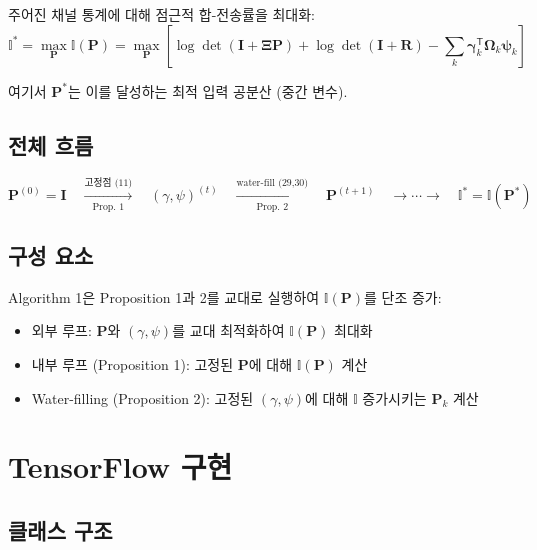 \documentclass[10pt]{article}
\begin{document}
주어진 채널 통계에 대해 점근적 합-전송률을 최대화:
\begin{equation*}
\mathbb{I}^* = \max_{\mathbf{P}} \mathbb{I}(\mathbf{P}) = \max_{\mathbf{P}} \left[ \log \det(\mathbf{I} + \boldsymbol{\Xi} \mathbf{P}) + \log \det(\mathbf{I} + \mathbf{R}) - \sum_{k} \boldsymbol{\gamma}_k^{\mathsf{T}} \boldsymbol{\Omega}_k \boldsymbol{\psi}_k \right]
\end{equation*}

여기서 $\mathbf{P}^*$는 이를 달성하는 최적 입력 공분산 (중간 변수).

\subsection{전체 흐름}

\begin{equation*}
\boxed{
\mathbf{P}^{(0)} = \mathbf{I} \quad 
\xrightarrow[\text{Prop. 1}]{\text{고정점 (11)}} \quad
(\gamma, \psi)^{(t)} \quad
\xrightarrow[\text{Prop. 2}]{\text{water-fill (29,30)}} \quad
\mathbf{P}^{(t+1)} \quad
\to \cdots \to \quad \mathbb{I}^* = \mathbb{I}(\mathbf{P}^*)
}
\end{equation*}

\subsection{구성 요소}

Algorithm 1은 Proposition 1과 2를 교대로 실행하여 $\mathbb{I}(\mathbf{P})$를 단조 증가:
\begin{itemize}
\item 외부 루프: $\mathbf{P}$와 $(\gamma, \psi)$를 교대 최적화하여 $\mathbb{I}(\mathbf{P})$ 최대화
\item 내부 루프 (Proposition 1): 고정된 $\mathbf{P}$에 대해 $\mathbb{I}(\mathbf{P})$ 계산
\item Water-filling (Proposition 2): 고정된 $(\gamma, \psi)$에 대해 $\mathbb{I}$ 증가시키는 $\mathbf{P}_k$ 계산
\end{itemize}

\newpage
\section{TensorFlow 구현}

\subsection{클래스 구조}
\end{document}
